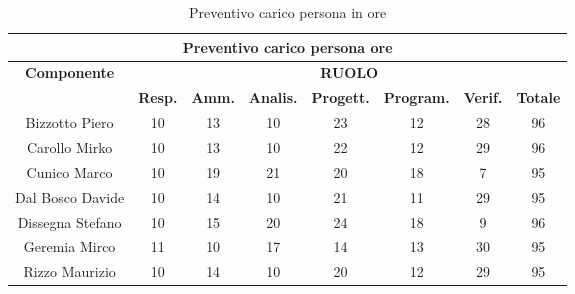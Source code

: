 \begin{table}[!h]
	\begin{center}
		  \begin{tabular}
			  {|c|c|c|c|c|c|c|c|}
		 \hline
			\multicolumn{8}{|c|}{ \textbf{Preventivo carico persona ore} } \\
			\hline
			\textbf{Componente} & \multicolumn{7}{|c|}{ \textbf{RUOLO} } \\
			\hline
			& \textbf{Resp.} & \textbf{Amm.} & \textbf{Analis.} & \textbf{Progett.} & \textbf{Program.} & \textbf{Verif.}  & \textbf{Totale}\\
			\hline
			Bizzotto Piero       &  10   &  13  &  10   &   23  &  12   &  28   &  96\\ %
			\hline
			Carollo Mirko        &  10   &  13  &  10   &   22  &  12   &  29  &  96\\ %
			\hline
			Cunico Marco         &  10   &  19  &  21   &   20  &  18   &  7  &   95\\ %
			\hline
			Dal Bosco Davide     &  10   &  14  &  10   &   21  &  11   &  29  &  95\\ %
			\hline
			Dissegna Stefano     &  10   &  15  &  20   &   24  &  18   &  9  &  96\\ %
			\hline
			Geremia Mirco        &  11   &  10  &  17   &   14  &  13   &  30  &  95\\ %
			\hline		
			Rizzo Maurizio       &  10   &  14  &  10   &   20  &  12   &  29  &  95\\
			\hline
		\end{tabular}
	\caption{Preventivo carico persona in ore} %
	\label{tab:TabellaPrevPersOre}
	\end{center}	
\end{table}

\newpage

